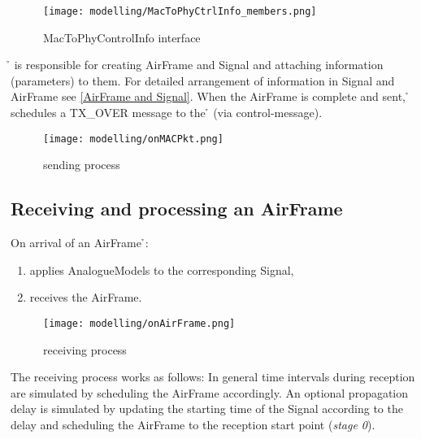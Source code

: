 \begin{figure}[H]
 \centering
 \texttt{[image: modelling/MacToPhyCtrlInfo\_members.png]}
 \caption{MacToPhyControlInfo interface}
 \label{fig: MacToPhyCtrlInfo interface}
\end{figure}

\h{\bp} is responsible for creating AirFrame and Signal and attaching information (parameters) to them. For detailed arrangement of information in Signal and AirFrame see \ref{AirFrame and Signal}.
When the AirFrame is complete and sent, \h{\bp} schedules a TX\_OVER message to the \h{\bm} (via control-message).

\begin{figure}[H]
 \centering
 \texttt{[image: modelling/onMACPkt.png]}
 \caption{sending process}
 \label{fig: sending process}
\end{figure}
\newpage



\subsection{Receiving and processing an AirFrame}

On arrival of an AirFrame \h{\bp}:
\begin{enumerate}
	
	\item applies AnalogueModels to the corresponding Signal,
	\item receives the AirFrame.
\end{enumerate}

\begin{figure}[H]
 \centering
 \texttt{[image: modelling/onAirFrame.png]}
 \caption{receiving process}
 \label{fig: receiving process}
\end{figure}


The receiving process works as follows: In general time intervals during reception are simulated by scheduling the AirFrame accordingly.
An optional propagation delay is simulated by updating the starting time of the Signal according to the delay and scheduling the AirFrame to the reception start point (\textit{stage 0}).\\

